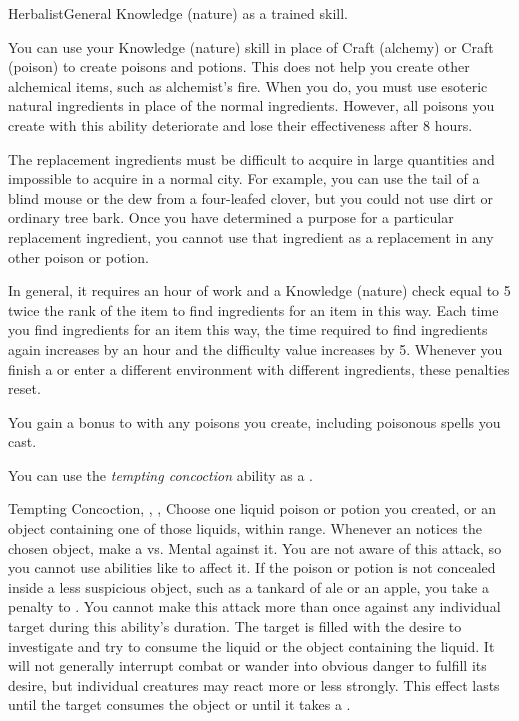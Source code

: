     \begin{feat}{Herbalist}{General}
        \featpre Knowledge (nature) as a trained skill.

         You can use your Knowledge (nature) skill in place of Craft (alchemy) or Craft (poison) to create poisons and potions.
        This does not help you create other alchemical items, such as alchemist's fire.
        When you do, you must use esoteric natural ingredients in place of the normal ingredients.
        However, all poisons you create with this ability deteriorate and lose their effectiveness after 8 hours.

        The replacement ingredients must be difficult to acquire in large quantities and impossible to acquire in a normal city.
        For example, you can use the tail of a blind mouse or the dew from a four-leafed clover, but you could not use dirt or ordinary tree bark.
        Once you have determined a purpose for a particular replacement ingredient, you cannot use that ingredient as a replacement in any other poison or potion.

        In general, it requires an hour of work and a Knowledge (nature) check equal to 5 \add twice the rank of the item to find ingredients for an item in this way.
        Each time you find ingredients for an item this way, the time required to find ingredients again increases by an hour and the difficulty value increases by 5.
        Whenever you finish a  or enter a different environment with different ingredients, these penalties reset.

         You gain a  bonus to  with any poisons you create, including poisonous spells you cast.

         You can use the \textit{tempting concoction} ability as a .
        \begin{attuneability}{Tempting Concoction}{, , , }
            \rankline
            Choose one liquid poison or potion you created, or an object containing one of those liquids, within \rngshort range.
            Whenever an  notices the chosen object, make a  vs. Mental against it.
            You are not aware of this attack, so you cannot use abilities like  to affect it.
            If the poison or potion is not concealed inside a less suspicious object, such as a tankard of ale or an apple, you take a  penalty to .
            You cannot make this attack more than once against any individual target during this ability's duration.
            \hit The target is filled with the desire to investigate and try to consume the liquid or the object containing the liquid.
            It will not generally interrupt combat or wander into obvious danger to fulfill its desire, but individual creatures may react more or less strongly.
            This effect lasts until the target consumes the object or until it takes a .


\end{attuneability}
\end{feat}
